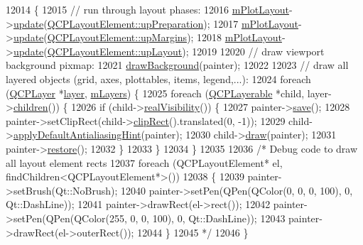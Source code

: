 \begin{DoxyCode}
12014                                           \{
12015   \textcolor{comment}{// run through layout phases:}
12016   \hyperlink{class_q_custom_plot_ac97298756882a0eecd98151679850ac1}{mPlotLayout}->\hyperlink{class_q_c_p_layout_a34ab477e820537ded7bade4399c482fd}{update}(\hyperlink{class_q_c_p_layout_element_a0d83360e05735735aaf6d7983c56374dad6119882eba136357c2f627992e527d3}{QCPLayoutElement::upPreparation});
12017   \hyperlink{class_q_custom_plot_ac97298756882a0eecd98151679850ac1}{mPlotLayout}->\hyperlink{class_q_c_p_layout_a34ab477e820537ded7bade4399c482fd}{update}(\hyperlink{class_q_c_p_layout_element_a0d83360e05735735aaf6d7983c56374da288cb59a92280e47261a341f2813e676}{QCPLayoutElement::upMargins});
12018   \hyperlink{class_q_custom_plot_ac97298756882a0eecd98151679850ac1}{mPlotLayout}->\hyperlink{class_q_c_p_layout_a34ab477e820537ded7bade4399c482fd}{update}(\hyperlink{class_q_c_p_layout_element_a0d83360e05735735aaf6d7983c56374da5d1ccf5d79967c232c3c511796860045}{QCPLayoutElement::upLayout});
12019 
12020   \textcolor{comment}{// draw viewport background pixmap:}
12021   \hyperlink{class_q_custom_plot_a05dd52438cee4353b18c1e53a439008d}{drawBackground}(painter);
12022 
12023   \textcolor{comment}{// draw all layered objects (grid, axes, plottables, items, legend,...):}
12024   \textcolor{keywordflow}{foreach} (\hyperlink{class_q_c_p_layer}{QCPLayer} *\hyperlink{class_q_custom_plot_aac492da01782820454e9136a8db28182}{layer}, \hyperlink{class_q_custom_plot_a9685e7ec1ef5e6066dd7d91bb3a698b3}{mLayers}) \{
12025     \textcolor{keywordflow}{foreach} (\hyperlink{class_q_c_p_layerable}{QCPLayerable} *child, layer->\hyperlink{class_q_c_p_layer_a94c2f0100e48cefad2de8fe0fbb03c27}{children}()) \{
12026       \textcolor{keywordflow}{if} (child->\hyperlink{class_q_c_p_layerable_a30809f7455e9794bca7b6c737622fa63}{realVisibility}()) \{
12027         painter->\hyperlink{class_q_c_p_painter_a8fd6821ee6fecbfa04444c9062912abd}{save}();
12028         painter->setClipRect(child->\hyperlink{class_q_c_p_layerable_a07a8f746640c3704b09910df297afcba}{clipRect}().translated(0, -1));
12029         child->\hyperlink{class_q_c_p_layerable_afdf83ddc6a265cbf4c89fe99d3d93473}{applyDefaultAntialiasingHint}(painter);
12030         child->\hyperlink{class_q_c_p_layerable_aecf2f7087482d4b6a78cb2770e5ed12d}{draw}(painter);
12031         painter->\hyperlink{class_q_c_p_painter_a64908e6298d5bbd83457dc987cc3a022}{restore}();
12032       \}
12033     \}
12034   \}
12035 
12036   \textcolor{comment}{/* Debug code to draw all layout element rects}
12037 \textcolor{comment}{  foreach (QCPLayoutElement* el, findChildren<QCPLayoutElement*>())}
12038 \textcolor{comment}{  \{}
12039 \textcolor{comment}{    painter->setBrush(Qt::NoBrush);}
12040 \textcolor{comment}{    painter->setPen(QPen(QColor(0, 0, 0, 100), 0, Qt::DashLine));}
12041 \textcolor{comment}{    painter->drawRect(el->rect());}
12042 \textcolor{comment}{    painter->setPen(QPen(QColor(255, 0, 0, 100), 0, Qt::DashLine));}
12043 \textcolor{comment}{    painter->drawRect(el->outerRect());}
12044 \textcolor{comment}{  \}}
12045 \textcolor{comment}{  */}
12046 \}
\end{DoxyCode}


